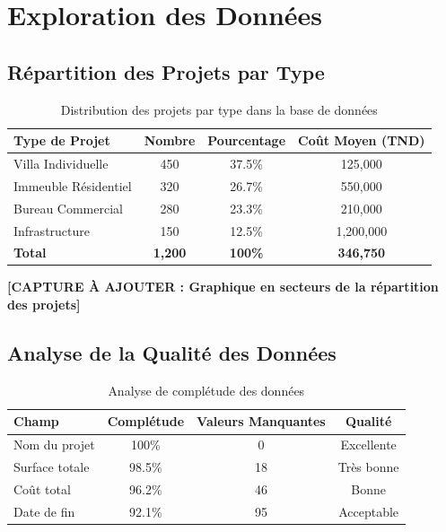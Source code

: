 \section{Exploration des Données}

\subsection{Répartition des Projets par Type}

\begin{table}[h]
\centering
\begin{tabular}{|l|c|c|c|}
\hline
\textbf{Type de Projet} & \textbf{Nombre} & \textbf{Pourcentage} & \textbf{Coût Moyen (TND)} \\
\hline
Villa Individuelle & 450 & 37.5\% & 125,000 \\
\hline
Immeuble Résidentiel & 320 & 26.7\% & 550,000 \\
\hline
Bureau Commercial & 280 & 23.3\% & 210,000 \\
\hline
Infrastructure & 150 & 12.5\% & 1,200,000 \\
\hline
\textbf{Total} & \textbf{1,200} & \textbf{100\%} & \textbf{346,750} \\
\hline
\end{tabular}
\caption{Distribution des projets par type dans la base de données}
\end{table}

\textbf{[CAPTURE À AJOUTER : Graphique en secteurs de la répartition des projets]}

\subsection{Analyse de la Qualité des Données}

\begin{table}[h]
\centering
\begin{tabular}{|l|c|c|c|}
\hline
\textbf{Champ} & \textbf{Complétude} & \textbf{Valeurs Manquantes} & \textbf{Qualité} \\
\hline
Nom du projet & 100\% & 0 & Excellente \\
\hline
Surface totale & 98.5\% & 18 & Très bonne \\
\hline
Coût total & 96.2\% & 46 & Bonne \\
\hline
Date de fin & 92.1\% & 95 & Acceptable \\
\hline
\end{tabular}
\caption{Analyse de complétude des données}
\end{table}

